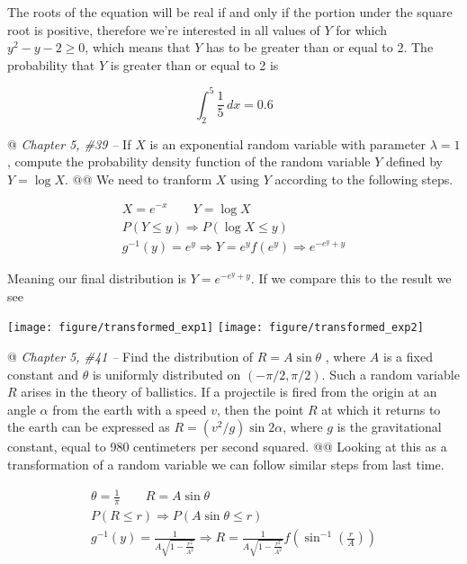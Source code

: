 \documentclass[10pt]{article}\usepackage[]{graphicx}\usepackage[]{xcolor}
\makeatletter
\def\maxwidth{ %
  \ifdim\Gin@nat@width>\linewidth
    \linewidth
  \else
    \Gin@nat@width
  \fi
}
\newenvironment{knitrout}{}{} %
\makeatother
\begin{document}
\begin{easylist}[enumerate]
    The roots of the equation will be real if and only if the portion under the square root is positive, therefore we're
    interested in all values of $Y$ for which $y^2 - y - 2 \ge 0$, which means that $Y$ has to be greater than or equal
    to 2. The probability that $Y$ is greater than or equal to 2 is

    \[
        \int_2^5 \frac{1}{5} \, dx = \boxed{0.6}
    \]

    @ \textit{Chapter 5, \#39 --} If $X$ is an exponential random variable with parameter $\lambda = 1$, compute the
    probability density function of the random variable $Y$ defined by $Y = \log X$.
    @@ We need to tranform $X$ using $Y$ according to the following steps.

    \[
        \begin{aligned}
            X = e^{-x} \qquad Y = \log X\\
            P(Y \le y) \Rightarrow P(\log X \le y)\\
            g^{-1}(y) = e^y \Rightarrow Y = e^y f(e^y) \Rightarrow e^{-e^y + y}
        \end{aligned}
    \]

    Meaning our final distribution is $\boxed{Y = e^{-e^y + y} }$. If we compare this to the result we see

\begin{knitrout}
\color{fgcolor}

{\centering \texttt{[image: figure/transformed\_exp1]} 
\texttt{[image: figure/transformed\_exp2]} 

}



\end{knitrout}


    @ \textit{Chapter 5, \#41 --} Find the distribution of $R = A \sin \theta$ , where $A$ is a fixed constant and
    $\theta$ is uniformly distributed on $(-\pi/2, \pi/2)$. Such a random variable $R$ arises in the theory of
    ballistics. If a projectile is fired from the origin at an angle $\alpha$ from the earth with a speed $v$, then the
    point $R$ at which it returns to the earth can be expressed as $R = (v^2/g) \sin 2 \alpha$, where $g$ is the
    gravitational constant, equal to 980 centimeters per second squared.
    @@ Looking at this as a transformation of a random variable we can follow similar steps from last time.

    \[
        \begin{aligned}
            \theta = \frac{1}{\pi} \qquad R = A \sin \theta\\
            P(R \le r) \Rightarrow P(A \sin \theta \le r)\\
            g^{-1}(y) = \frac{1}{A \sqrt{1-\frac{r^2}{A^2} } } \Rightarrow R =
                \frac{1}{A \sqrt{1-\frac{r^2}{A^2} } } f\left(\sin^{-1} \left( \frac{r}{A} \right)\right)\\
        \end{aligned}
    \]


\end{easylist}
\end{document}
